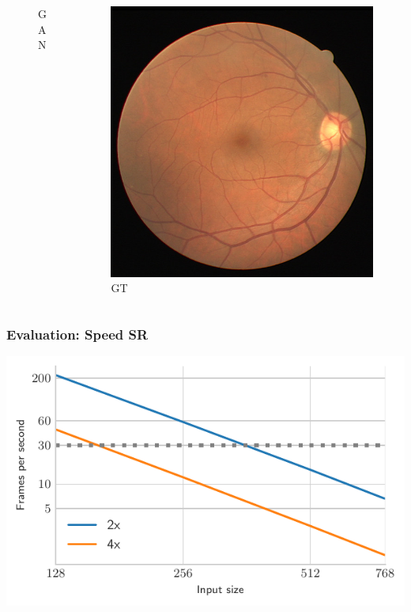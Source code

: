 \documentclass{beamer}
\begin{document}
\begin{frame}
\begin{columns}
\begin{column}{0.33\linewidth}
\begin{figure}[htb]
        \caption*{GAN}
      \end{figure}
    \end{column}
  \begin{column}{0.33\linewidth}
      \centering
      \begin{figure}[htb]
        \centering
        \includegraphics[width=1.0\textwidth]{deblur_gt}
        \caption*{GT}
      \end{figure}
    \end{column}
\end{columns}
\end{frame}

\begin{frame} \frametitle{Evaluation: Speed SR}
  \includegraphics{time_upscaling_beamer}
\end{frame}
\end{document}
